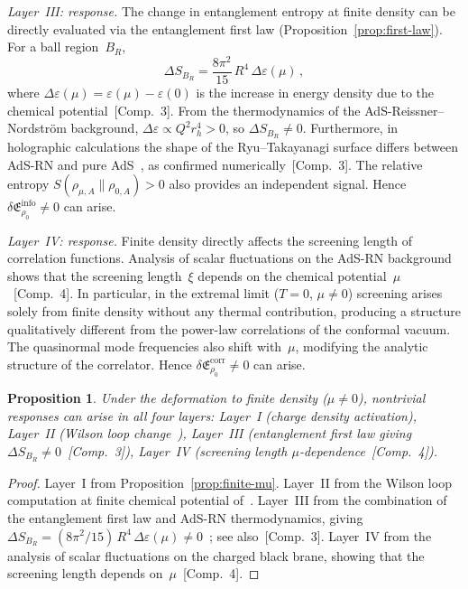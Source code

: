 \documentclass[
  aps,
  prd,
  preprint,
  groupedaddress,
  nofootinbib,
  longbibliography
]{revtex4-2}
\newtheorem{proposition}[definition]{Proposition}
\theoremstyle{remark}
\begin{document}
\emph{Layer~III: response.}
The change in entanglement entropy at finite density can be
directly evaluated via the entanglement first law
(Proposition~\ref{prop:first-law}).
For a ball region~$B_R$,
\begin{equation}\label{eq:EE-density}
  \Delta S_{B_R}
  = \frac{8\pi^2}{15}\,R^4\,\Delta\varepsilon(\mu)\,,
\end{equation}
where
$\Delta\varepsilon(\mu)=\varepsilon(\mu)-\varepsilon(0)$
is the increase in energy density due to the chemical
potential~[Comp.~3].
From the thermodynamics of the AdS-Reissner--Nordstr\"om
background,
$\Delta\varepsilon\propto Q^2 r_h^4>0$, so
$\Delta S_{B_R}\neq 0$.
Furthermore, in holographic calculations the shape of the
Ryu--Takayanagi surface differs between AdS-RN and pure
AdS~\cite{ref42}, as confirmed
numerically~[Comp.~3].
The relative entropy
$S(\rho_{\mu,A}\|\rho_{0,A})>0$ also provides an independent
signal.
Hence
$\delta\mathfrak{E}_{\rho_0}^{\mathrm{info}}\neq 0$
can arise.

\emph{Layer~IV: response.}
Finite density directly affects the screening length of
correlation functions.
Analysis of scalar fluctuations on the AdS-RN background shows
that the screening length~$\xi$ depends on the chemical
potential~$\mu$~[Comp.~4].
In particular, in the extremal limit ($T=0$, $\mu\neq 0$)
screening arises solely from finite density without any thermal
contribution, producing a structure qualitatively different from
the power-law correlations of the conformal vacuum.
The quasinormal mode frequencies also shift with~$\mu$,
modifying the analytic structure of the correlator.
Hence
$\delta\mathfrak{E}_{\rho_0}^{\mathrm{corr}}\neq 0$
can arise.

\begin{proposition}\label{prop:density-all-layers}
Under the deformation to finite density ($\mu\neq 0$),
nontrivial responses can arise in all four layers:
Layer~I (charge density activation),
Layer~II (Wilson loop change~\cite{ref44}),
Layer~III (entanglement first law giving
$\Delta S_{B_R}\neq 0$~[Comp.~3]),
Layer~IV (screening length $\mu$-dependence~[Comp.~4]).
\end{proposition}

\begin{proof}
Layer~I from
Proposition~\ref{prop:finite-mu}.
Layer~II from the Wilson loop computation at finite chemical
potential of~\cite{ref44}.
Layer~III from the combination of the entanglement first law
and AdS-RN thermodynamics, giving
$\Delta S_{B_R}=(8\pi^2/15)\,R^4\,\Delta\varepsilon(\mu)
\neq 0$~\cite{ref42}; see also~[Comp.~3].
Layer~IV from the analysis of scalar fluctuations on the
charged black brane, showing that the screening length depends
on~$\mu$~[Comp.~4].
\end{proof}
\end{document}
